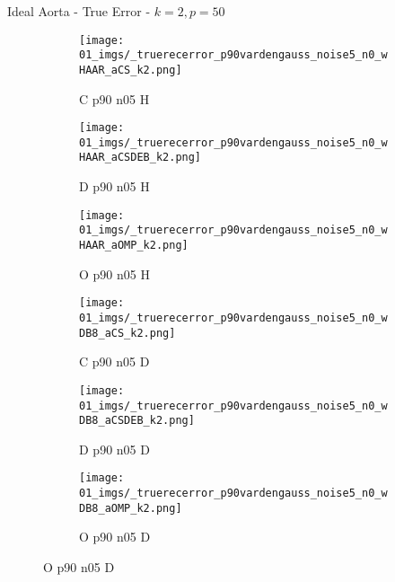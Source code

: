 \begin{frame}{Ideal Aorta - True Error - $k=2,p=50$}{}
\begin{figure}
\begin{subfigure}{0.13\textwidth}
\texttt{[image: 01\_imgs/\_truerecerror\_p90vardengauss\_noise5\_n0\_wHAAR\_aCS\_k2.png]}
\caption*{\tiny C p90 n05 H}
\end{subfigure}
\begin{subfigure}{0.13\textwidth}
\texttt{[image: 01\_imgs/\_truerecerror\_p90vardengauss\_noise5\_n0\_wHAAR\_aCSDEB\_k2.png]}
\caption*{\tiny D p90 n05 H}
\end{subfigure}
\begin{subfigure}{0.13\textwidth}
\texttt{[image: 01\_imgs/\_truerecerror\_p90vardengauss\_noise5\_n0\_wHAAR\_aOMP\_k2.png]}
\caption*{\tiny O p90 n05 H}
\end{subfigure}
\begin{subfigure}{0.13\textwidth}
\texttt{[image: 01\_imgs/\_truerecerror\_p90vardengauss\_noise5\_n0\_wDB8\_aCS\_k2.png]}
\caption*{\tiny C p90 n05 D}
\end{subfigure}
\begin{subfigure}{0.13\textwidth}
\texttt{[image: 01\_imgs/\_truerecerror\_p90vardengauss\_noise5\_n0\_wDB8\_aCSDEB\_k2.png]}
\caption*{\tiny D p90 n05 D}
\end{subfigure}
\begin{subfigure}{0.13\textwidth}
\texttt{[image: 01\_imgs/\_truerecerror\_p90vardengauss\_noise5\_n0\_wDB8\_aOMP\_k2.png]}
\caption*{\tiny O p90 n05 D}
\end{subfigure}

\vspace{5pt}


\end{figure}
\end{frame}
